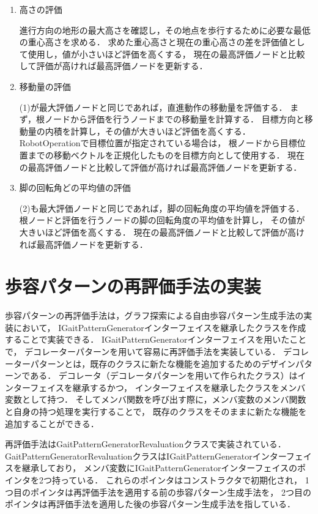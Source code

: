 \begin{enumerate}
  \item 高さの評価\par
        進行方向の地形の最大高さを確認し，その地点を歩行するために必要な最低の重心高さを求める．
        求めた重心高さと現在の重心高さの差を評価値として使用し，値が小さいほど評価を高くする，
        現在の最高評価ノードと比較して評価が高ければ最高評価ノードを更新する．
  \item 移動量の評価\par
        (1)が最大評価ノードと同じであれば，直進動作の移動量を評価する．
        まず，根ノードから評価を行うノードまでの移動量を計算する．
        目標方向と移動量の内積を計算し，その値が大きいほど評価を高くする．
        RobotOperationで目標位置が指定されている場合は，
        根ノードから目標位置までの移動ベクトルを正規化したものを目標方向として使用する．
        現在の最高評価ノードと比較して評価が高ければ最高評価ノードを更新する．        
  \item 脚の回転角どの平均値の評価\par
        (2)も最大評価ノードと同じであれば，脚の回転角度の平均値を評価する．
        根ノードと評価を行うノードの脚の回転角度の平均値を計算し，
        その値が大きいほど評価を高くする．
        現在の最高評価ノードと比較して評価が高ければ最高評価ノードを更新する．
\end{enumerate}

\section{歩容パターンの再評価手法の実装}
歩容パターンの再評価手法は，グラフ探索による自由歩容パターン生成手法の実装において，
IGaitPatternGeneratorインターフェイスを継承したクラスを作成することで実装できる．
IGaitPatternGeneratorインターフェイスを用いたことで，
デコレーターパターンを用いて容易に再評価手法を実装している．
デコレーターパターンとは，既存のクラスに新たな機能を追加するためのデザインパターンである．
デコレータ（デコレータパターンを用いて作られたクラス）はインターフェイスを継承するかつ，
インターフェイスを継承したクラスをメンバ変数として持つ．
そしてメンバ関数を呼び出す際に，メンバ変数のメンバ関数と自身の持つ処理を実行することで，
既存のクラスをそのままに新たな機能を追加することができる．

再評価手法はGaitPatternGeneratorRevaluationクラスで実装されている．
GaitPatternGeneratorRevaluationクラスはIGaitPatternGeneratorインターフェイスを継承しており，
メンバ変数にIGaitPatternGeneratorインターフェイスのポインタを2つ持っている．
これらのポインタはコンストラクタで初期化され，
1つ目のポインタは再評価手法を適用する前の歩容パターン生成手法を，
2つ目のポインタは再評価手法を適用した後の歩容パターン生成手法を指している．

